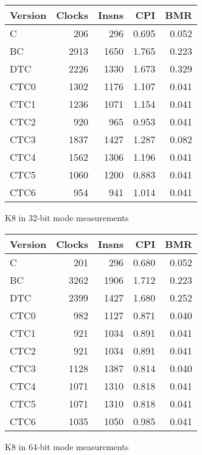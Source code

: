 \documentclass[10pt,a4paper]{article}
\begin{document}
\begin{figure}[htb]
\begin{center}
\begin{tabular}{|@{~}l|r|r|r|r|}
\hline
Version & Clocks & Insns & CPI & BMR \\
\hline
C    &  206 &  296 & 0.695 & 0.052 \\
BC   & 2913 & 1650 & 1.765 & 0.223 \\
DTC  & 2226 & 1330 & 1.673 & 0.329 \\
CTC0 & 1302 & 1176 & 1.107 & 0.041 \\
CTC1 & 1236 & 1071 & 1.154 & 0.041 \\
CTC2 &  920 &  965 & 0.953 & 0.041 \\
CTC3 & 1837 & 1427 & 1.287 & 0.082 \\
CTC4 & 1562 & 1306 & 1.196 & 0.041 \\
CTC5 & 1060 & 1200 & 0.883 & 0.041 \\
CTC6 &  954 &  941 & 1.014 & 0.041 \\
\hline
\end{tabular}
\end{center}
\caption{K8 in 32-bit mode measurements}
\label{fig:measurements-k8-32}
\end{figure}

\begin{figure}[htb]
\begin{center}
\begin{tabular}{|@{~}l|r|r|r|r|}
\hline
Version & Clocks & Insns & CPI & BMR \\
\hline
C    &  201 &  296 & 0.680 & 0.052 \\
BC   & 3262 & 1906 & 1.712 & 0.223 \\
DTC  & 2399 & 1427 & 1.680 & 0.252 \\
CTC0 &  982 & 1127 & 0.871 & 0.040 \\
CTC1 &  921 & 1034 & 0.891 & 0.041 \\
CTC2 &  921 & 1034 & 0.891 & 0.041 \\
CTC3 & 1128 & 1387 & 0.814 & 0.040 \\
CTC4 & 1071 & 1310 & 0.818 & 0.041 \\
CTC5 & 1071 & 1310 & 0.818 & 0.041 \\
CTC6 & 1035 & 1050 & 0.985 & 0.041 \\
\hline
\end{tabular}
\end{center}
\caption{K8 in 64-bit mode measurements}
\label{fig:measurements-k8-64}
\end{figure}
\end{document}
